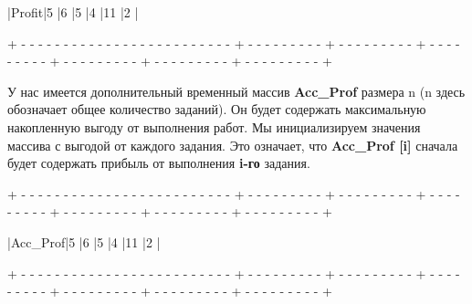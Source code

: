 \begin{tcolorbox}
\hspace{0.4mm}|\hspace{17.6mm}Profit\hspace{17.6mm}|\hspace{7.1mm}5\hspace{7.1mm} |\hspace{7.1mm}6\hspace{7.1mm} |\hspace{7.1mm}5\hspace{7.1mm} |\hspace{7.1mm}4\hspace{7.1mm} |\hspace{5.8mm}11\hspace{5.8mm} |\hspace{7.1mm}2\hspace{7.1mm} |

{\tiny{+ - - - - - - - - - - - - - - - - - - - - - - - - - + - - - - - - - - - + - - - - - - - - - + - - - - - - - - - + - - - - - - - - - + - - - - - - - - - + - - - - - - - - - +}}
\end{tcolorbox}

\vspace{\baselineskip}
У нас имеется дополнительный временный массив {\bfseries Acc\_Prof} размера n (n здесь обозначает общее количество заданий). Он будет содержать максимальную накопленную выгоду от выполнения работ. Мы инициализируем значения массива с выгодой от каждого задания. Это означает, что {\bfseries Acc\_Prof [i]} сначала будет содержать прибыль от выполнения {\bfseries i-го} задания. 

\vspace{\baselineskip}
\begin{tcolorbox}
{\tiny{+ - - - - - - - - - - - - - - - - - - - - - - - - - + - - - - - - - - - + - - - - - - - - - + - - - - - - - - - + - - - - - - - - - + - - - - - - - - - + - - - - - - - - - +}}

\hspace{0.4mm}|\hspace{14mm}Acc\_Prof\hspace{14mm}|\hspace{7.1mm}5\hspace{7.1mm} |\hspace{7.1mm}6\hspace{7.1mm} |\hspace{7.1mm}5\hspace{7.1mm} |\hspace{7.1mm}4\hspace{7.1mm} |\hspace{5.8mm}11\hspace{5.8mm} |\hspace{7.1mm}2\hspace{7.1mm} |

{\tiny{+ - - - - - - - - - - - - - - - - - - - - - - - - - + - - - - - - - - - + - - - - - - - - - + - - - - - - - - - + - - - - - - - - - + - - - - - - - - - + - - - - - - - - - +}}
\end{tcolorbox}

